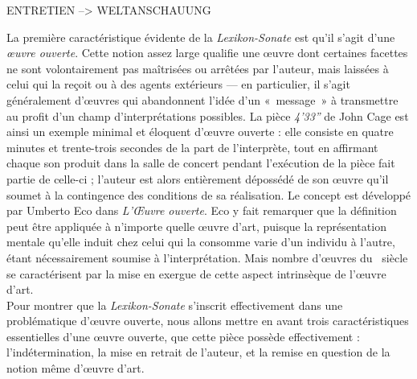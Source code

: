 \documentclass[a4paper,12pt]{article}
\newcommand{\guill}[1]{«~#1~»}
\begin{document}
ENTRETIEN --> WELTANSCHAUUNG

La première caractéristique évidente de la \emph{Lexikon-Sonate} est qu'il s'agit d'une \emph{œuvre ouverte}. Cette notion assez large qualifie une œuvre dont certaines facettes ne sont volontairement pas maîtrisées ou arrêtées par l'auteur, mais laissées à celui qui la reçoit ou à des agents extérieurs --- en particulier, il s'agit généralement d'œuvres qui abandonnent l'idée d'un \guill{message} à transmettre au profit d'un champ d'interprétations possibles. La pièce \emph{4'33''} de John Cage est ainsi un exemple minimal et éloquent d'œuvre ouverte : elle consiste en quatre minutes et trente-trois secondes de la part de l'interprète, tout en affirmant chaque son produit dans la salle de concert pendant l'exécution de la pièce fait partie de celle-ci ; l'auteur est alors entièrement dépossédé de son œuvre qu'il soumet à la contingence des conditions de sa réalisation. Le concept est développé par Umberto Eco dans \emph{L'Œuvre ouverte}. Eco y fait remarquer que la définition peut être appliquée à n'importe quelle œuvre d'art, puisque la représentation mentale qu'elle induit chez celui qui la consomme varie d'un individu à l'autre, étant nécessairement soumise à l'interprétation. Mais nombre d'œuvres du \XXe~siècle se caractérisent par la mise en exergue de cette aspect intrinsèque de l'œuvre d'art. \\
Pour montrer que la \emph{Lexikon-Sonate} s'inscrit effectivement dans une problématique d'œuvre ouverte, nous allons mettre en avant trois caractéristiques essentielles d'une œuvre ouverte, que cette pièce possède effectivement : l'indétermination, la mise en retrait de l'auteur, et la remise en question de la notion même d'œuvre d'art. \\
\end{document}
